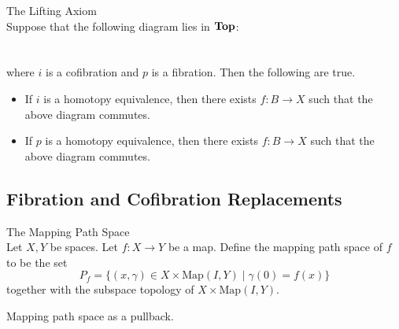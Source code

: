 \documentclass[a4paper]{article}
\begin{document}
\begin{thm}{The Lifting Axiom}{}\\
Suppose that the following diagram lies in $\bold{Top}$: \\
\\~\\
where $i$ is a cofibration and $p$ is a fibration. Then the following are true. 
\begin{itemize}
\item If $i$ is a homotopy equivalence, then there exists $f:B\to X$ such that the above diagram commutes. 
\item If $p$ is a homotopy equivalence, then there exists $f:B\to X$ such that the above diagram commutes. 
\end{itemize}
\end{thm}

\subsection{Fibration and Cofibration Replacements}
\begin{defn}{The Mapping Path Space}{}\\
Let $X,Y$ be spaces. Let $f:X\to Y$ be a map. Define the mapping path space of $f$ to be the set $$P_f=\{(x,\gamma)\in X\times\text{Map}(I,Y)\;|\;\gamma(0)=f(x)\}$$ together with the subspace topology of $X\times\text{Map}(I,Y)$. 
\end{defn}

Mapping path space as a pullback. 
\end{document}
